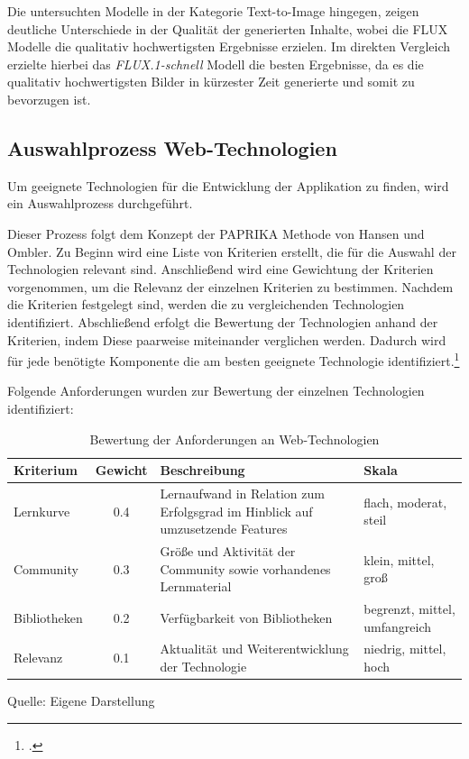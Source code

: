 Die untersuchten Modelle in der Kategorie Text-to-Image hingegen, zeigen deutliche Unterschiede in der Qualität der generierten Inhalte, wobei die FLUX Modelle die qualitativ hochwertigsten Ergebnisse erzielen.
Im direkten Vergleich erzielte hierbei das \textit{FLUX.1-schnell} Modell die besten Ergebnisse, da es die qualitativ hochwertigsten Bilder in kürzester Zeit generierte und somit zu bevorzugen ist.
\clearpage

\subsection{Auswahlprozess Web-Technologien}
Um geeignete Technologien für die Entwicklung der Applikation zu finden, wird ein Auswahlprozess durchgeführt.

Dieser Prozess folgt dem Konzept der PAPRIKA Methode von Hansen und Ombler.
Zu Beginn wird eine Liste von Kriterien erstellt, die für die Auswahl der Technologien relevant sind.
Anschließend wird eine Gewichtung der Kriterien vorgenommen, um die Relevanz der einzelnen Kriterien zu bestimmen.
Nachdem die Kriterien festgelegt sind, werden die zu vergleichenden Technologien identifiziert.
Abschließend erfolgt die Bewertung der Technologien anhand der Kriterien, indem Diese paarweise miteinander verglichen werden.
Dadurch wird für jede benötigte Komponente die am besten geeignete Technologie identifiziert.\footcite{Paprika2008}

Folgende Anforderungen wurden zur Bewertung der einzelnen Technologien identifiziert:

\begin{table}[htbp]
  \centering
  \begin{tabular}{|p{2cm}|c|p{5cm}|p{4cm}|}
      \hline
      \textbf{Kriterium} & \textbf{Gewicht} & \textbf{Beschreibung} & \textbf{Skala}\\ \hline
      {Lernkurve} & 0.4 & Lernaufwand in Relation zum Erfolgsgrad im Hinblick auf umzusetzende Features & flach, moderat, steil\\ \hline
      {Community} & 0.3 & Größe und Aktivität der Community sowie vorhandenes Lernmaterial & klein, mittel, groß\\ \hline
      {Bibliotheken} & 0.2 & Verfügbarkeit von Bibliotheken & begrenzt, mittel, umfangreich\\ \hline
      {Relevanz} & 0.1 & Aktualität und Weiterentwicklung der Technologie & niedrig, mittel, hoch\\ \hline
  \end{tabular}
  \caption{Bewertung der Anforderungen an Web-Technologien}\label{tab:table}
  \raggedright Quelle: Eigene Darstellung
\end{table}

